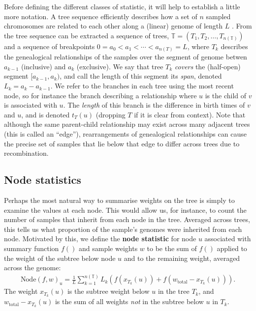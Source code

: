 \documentclass{article}
\newcommand{\node}{\mbox{Node}} %
\newcommand{\treeseq}{\mathbb{T}} %
\newcommand{\iw}{w} %
\newcommand{\tiw}{w_\text{total}} %
\newcommand{\nw}{x} %
\begin{document}
Before defining the different classes of statistic,
it will help to establish a little more notation.
A tree sequence efficiently describes how a set of $n$ sampled chromosomes
are related to each other along a (linear) genome of length $L$ \citep{kelleher2016efficient,kelleher2018efficient}.
From the tree sequence can be extracted a sequence of trees,
$\treeseq = (T_1, T_2, \ldots, T_{n(\treeseq)})$
and a sequence of breakpoints $0 = a_0 < a_1 < \cdots < a_{n(T)} = L$,
where $T_k$ describes the genealogical relationships of the samples
over the segment of genome betwen $a_{k-1}$ (inclusive) and $a_k$ (exclusive).
We say that tree $T_k$ \emph{covers} the (half-open) segment $[a_{k-1}, a_k)$,
and call the length of this segment its \emph{span}, denoted $L_k = a_k - a_{k-1}$.
We refer to the branches in each tree using the most recent node,
so for instance the branch describing a relationship where $u$ is the child of $v$
is associated with $u$.
The \emph{length} of this branch is the difference in birth times of $v$ and $u$,
and is denoted $t_T(u)$ (dropping $T$ if it is clear from context).
Note that although the same parent-child relationship may exist across many adjacent trees
(this is called an ``edge''),
rearrangements of genealogical relationships
can cause the precise set of samples that lie below that edge to differ across
trees due to recombination.


\subsection*{Node statistics}

Perhaps the most natural way to summarise weights on the tree
is simply to examine the values at each node.
This would allow us, for instance, to
count the number of samples that inherit from each node in the tree.
Averaged across trees,
this tells us what proportion of the sample's genomes were inherited from each node.
Motivated by this, we define the
\textbf{node statistic} for node $u$
associated with summary function $f()$ and sample weights $\iw$
to be the sum of $f()$ applied to the weight of the subtree below node $u$
and to the remaining weight,
averaged across the genome:
\begin{align}
    \node(f, \iw)_u
    =
    \frac{1}{L} \sum_{k=1}^{n(\treeseq)} L_k \left( f(\nw_{T_k}(u)) + f(\tiw - \nw_{T_k}(u)) \right).
\end{align}
The weight $\nw_{T_k}(u)$ is the subtree weight below $u$ in the tree $T_k$,
and $\tiw - \nw_{T_k}(u)$ is the sum of all weights \emph{not} in the subtree below $u$ in $T_k$.
\end{document}
